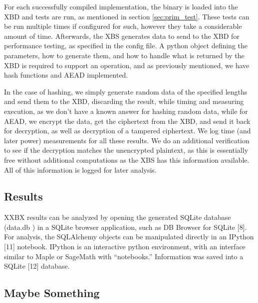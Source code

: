 \documentclass[twoside,11pt]{cergdoc}
\begin{document}

For each successfully compiled implementation, the binary is loaded into the XBD
and tests are run, as mentioned in section \ref{sec:prim_test}. These tests can
be run multiple times if configured for such, however they take a considerable
amount of time. Afterwards, the XBS generates data to send to the XBD for
performance testing, as specified in the config file. A python object defining
the parameters, how to generate them, and how to handle what is returned by the
XBD is required to support an operation, and as previously mentioned, we have
hash functions and AEAD implemented. 

In the case of hashing, we simply generate random data of the specified lengths
and send them to the XBD, discarding the result, while timing and measuring
execution, as we don't have a known answer
for hashing random data, while for AEAD, we encrypt the data, get the ciphertext
from the XBD, and send it back for decryption, as well as decryption of a
tampered ciphertext. We log time (and later power) measurements for all these
results. We do an additional verification to see if the decryption matches the
unencrypted plaintext, as this is essentially free without additional
computations as the XBS has this information available.  All of this information
is logged for later analysis. 


  \section{Results}
XXBX results can be analyzed by
opening the generated SQLite database
(data.db ) in a SQLite browser application,
such as DB Browser for SQLite [8]. For
analysis, the SQLAlchemy objects can be
manipulated directly in an IPython [11]
notebook. IPython is an interactive python
environment, with an interface similar to
Maple or SageMath with “notebooks.”
Information was saved into a SQLite [12]
database.


\begin{appendix}
\chapter{Maybe Something}
\end{appendix}
\end{document}
